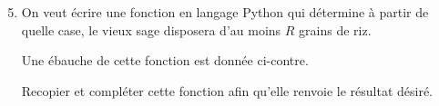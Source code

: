 \begin{multicols}{2}
\begin{enumerate}
\setcounter{enumi}{4}
\item  On veut écrire une fonction en langage Python qui détermine à partir de quelle case, le vieux sage disposera d'au moins $R$ grains de riz. 

Une ébauche de cette fonction est donnée ci-contre.

Recopier et compléter cette fonction afin qu'elle renvoie le résultat désiré.
\end{enumerate}

\columnbreak

\begin{center}
\end{center}
\end{multicols}


